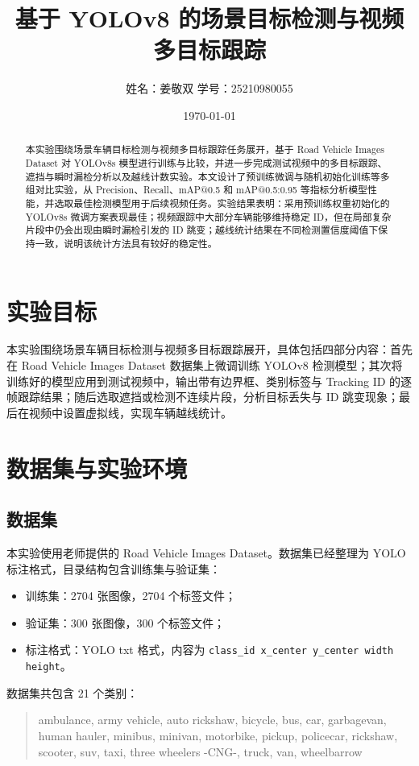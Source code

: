 \documentclass[UTF8,a4paper,12pt,fontset=fandol]{ctexart}
\title{基于 YOLOv8 的场景目标检测与视频多目标跟踪}
\author{姓名：姜敬双 \quad 学号：25210980055}
\date{\today}
\begin{document}
\maketitle

\begin{abstract}
本实验围绕场景车辆目标检测与视频多目标跟踪任务展开，基于 Road Vehicle Images Dataset 对 YOLOv8s 模型进行训练与比较，并进一步完成测试视频中的多目标跟踪、遮挡与瞬时漏检分析以及越线计数实验。本文设计了预训练微调与随机初始化训练等多组对比实验，从 Precision、Recall、mAP@0.5 和 mAP@0.5:0.95 等指标分析模型性能，并选取最佳检测模型用于后续视频任务。实验结果表明：采用预训练权重初始化的 YOLOv8s 微调方案表现最佳；视频跟踪中大部分车辆能够维持稳定 ID，但在局部复杂片段中仍会出现由瞬时漏检引发的 ID 跳变；越线统计结果在不同检测置信度阈值下保持一致，说明该统计方法具有较好的稳定性。
\end{abstract}

\section{实验目标}
本实验围绕场景车辆目标检测与视频多目标跟踪展开，具体包括四部分内容：首先在 Road Vehicle Images Dataset 数据集上微调训练 YOLOv8 检测模型；其次将训练好的模型应用到测试视频中，输出带有边界框、类别标签与 Tracking ID 的逐帧跟踪结果；随后选取遮挡或检测不连续片段，分析目标丢失与 ID 跳变现象；最后在视频中设置虚拟线，实现车辆越线统计。

\section{数据集与实验环境}

\subsection{数据集}
本实验使用老师提供的 Road Vehicle Images Dataset。数据集已经整理为 YOLO 标注格式，目录结构包含训练集与验证集：
\begin{itemize}
    \item 训练集：2704 张图像，2704 个标签文件；
    \item 验证集：300 张图像，300 个标签文件；
    \item 标注格式：YOLO txt 格式，内容为 \texttt{class\_id x\_center y\_center width height}。
\end{itemize}

数据集共包含 21 个类别：
\begin{quote}
\small\ttfamily
ambulance, army vehicle, auto rickshaw, bicycle, bus, car, garbagevan, human hauler,
minibus, minivan, motorbike, pickup, policecar, rickshaw, scooter, suv, taxi,
three wheelers -CNG-, truck, van, wheelbarrow
\end{quote}
\end{document}
